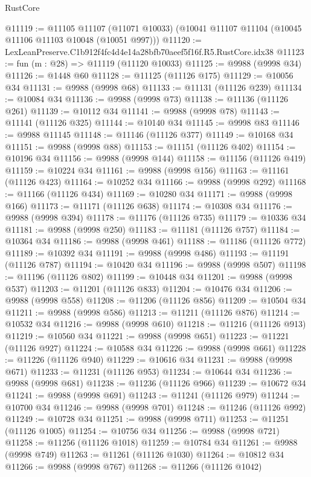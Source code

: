 \begin{lexlean}{RustCore}
\begin{coremodule}
@11119 := @11105
    @11107
    (@11071 @10033)
    (@10041 @11107 @11104 (@10045 @11106 @11103 @10048 (@10051 @997)))
@11120 := LexLeanPreserve.C1b912f4fc4d4e14a28bfb70aeef5f16f.R5.RustCore.idx38
@11123 := fun (m : @28) => @11119 (@11120 @10033)
@11125 := @9988 (@9998 @34)
@11126 := @1448 @60
@11128 := @11125 (@11126 @175)
@11129 := @10056 @34
@11131 := @9988 (@9998 @68)
@11133 := @11131 (@11126 @239)
@11134 := @10084 @34
@11136 := @9988 (@9998 @73)
@11138 := @11136 (@11126 @261)
@11139 := @10112 @34
@11141 := @9988 (@9998 @78)
@11143 := @11141 (@11126 @325)
@11144 := @10140 @34
@11145 := @9998 @83
@11146 := @9988 @11145
@11148 := @11146 (@11126 @377)
@11149 := @10168 @34
@11151 := @9988 (@9998 @88)
@11153 := @11151 (@11126 @402)
@11154 := @10196 @34
@11156 := @9988 (@9998 @144)
@11158 := @11156 (@11126 @419)
@11159 := @10224 @34
@11161 := @9988 (@9998 @156)
@11163 := @11161 (@11126 @423)
@11164 := @10252 @34
@11166 := @9988 (@9998 @292)
@11168 := @11166 (@11126 @434)
@11169 := @10280 @34
@11171 := @9988 (@9998 @166)
@11173 := @11171 (@11126 @638)
@11174 := @10308 @34
@11176 := @9988 (@9998 @394)
@11178 := @11176 (@11126 @735)
@11179 := @10336 @34
@11181 := @9988 (@9998 @250)
@11183 := @11181 (@11126 @757)
@11184 := @10364 @34
@11186 := @9988 (@9998 @461)
@11188 := @11186 (@11126 @772)
@11189 := @10392 @34
@11191 := @9988 (@9998 @486)
@11193 := @11191 (@11126 @787)
@11194 := @10420 @34
@11196 := @9988 (@9998 @507)
@11198 := @11196 (@11126 @802)
@11199 := @10448 @34
@11201 := @9988 (@9998 @537)
@11203 := @11201 (@11126 @833)
@11204 := @10476 @34
@11206 := @9988 (@9998 @558)
@11208 := @11206 (@11126 @856)
@11209 := @10504 @34
@11211 := @9988 (@9998 @586)
@11213 := @11211 (@11126 @876)
@11214 := @10532 @34
@11216 := @9988 (@9998 @610)
@11218 := @11216 (@11126 @913)
@11219 := @10560 @34
@11221 := @9988 (@9998 @651)
@11223 := @11221 (@11126 @927)
@11224 := @10588 @34
@11226 := @9988 (@9998 @661)
@11228 := @11226 (@11126 @940)
@11229 := @10616 @34
@11231 := @9988 (@9998 @671)
@11233 := @11231 (@11126 @953)
@11234 := @10644 @34
@11236 := @9988 (@9998 @681)
@11238 := @11236 (@11126 @966)
@11239 := @10672 @34
@11241 := @9988 (@9998 @691)
@11243 := @11241 (@11126 @979)
@11244 := @10700 @34
@11246 := @9988 (@9998 @701)
@11248 := @11246 (@11126 @992)
@11249 := @10728 @34
@11251 := @9988 (@9998 @711)
@11253 := @11251 (@11126 @1005)
@11254 := @10756 @34
@11256 := @9988 (@9998 @721)
@11258 := @11256 (@11126 @1018)
@11259 := @10784 @34
@11261 := @9988 (@9998 @749)
@11263 := @11261 (@11126 @1030)
@11264 := @10812 @34
@11266 := @9988 (@9998 @767)
@11268 := @11266 (@11126 @1042)

\end{coremodule}
\end{lexlean}
